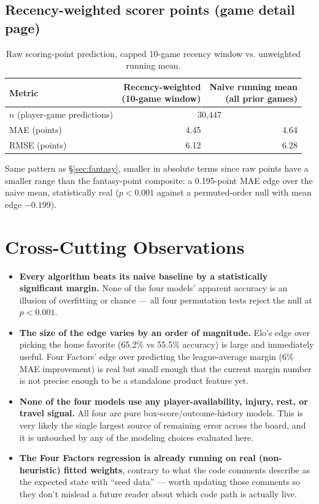 \documentclass[11pt]{article}
\begin{document}
\subsection{Recency-weighted scorer points (game detail page)}
\label{sec:scorers}

\begin{table}[h]
\centering
\small
\begin{tabular}{lrr}
\toprule
Metric & \shortstack{Recency-weighted\\(10-game window)} & \shortstack{Naive running mean\\(all prior games)} \\
\midrule
$n$ (player-game predictions) & \multicolumn{2}{c}{30,447} \\
MAE (points) & 4.45 & 4.64 \\
RMSE (points) & 6.12 & 6.28 \\
\bottomrule
\end{tabular}
\caption{Raw scoring-point prediction, capped 10-game recency window vs. unweighted running mean.}
\end{table}

Same pattern as \S\ref{sec:fantasy}, smaller in absolute terms since raw points have a smaller range than
the fantasy-point composite: a 0.195-point MAE edge over the naive mean, statistically real
($p < 0.001$ against a permuted-order null with mean edge $-0.199$).

\section{Cross-Cutting Observations}

\begin{itemize}
    \item \textbf{Every algorithm beats its naive baseline by a statistically significant margin.} None of the
    four models' apparent accuracy is an illusion of overfitting or chance — all four permutation tests
    reject the null at $p < 0.001$.
    \item \textbf{The size of the edge varies by an order of magnitude.} Elo's edge over picking the home
    favorite (65.2\% vs 55.5\% accuracy) is large and immediately useful. Four Factors' edge over predicting
    the league-average margin (6\% MAE improvement) is real but small enough that the current margin number
    is not precise enough to be a standalone product feature yet.
    \item \textbf{None of the four models use any player-availability, injury, rest, or travel signal.} All
    four are pure box-score/outcome-history models. This is very likely the single largest source of
    remaining error across the board, and it is untouched by any of the modeling choices evaluated here.
    \item \textbf{The Four Factors regression is already running on real (non-heuristic) fitted weights},
    contrary to what the code comments describe as the expected state with ``seed data'' — worth updating
    those comments so they don't mislead a future reader about which code path is actually live.
\end{itemize}
\end{document}
